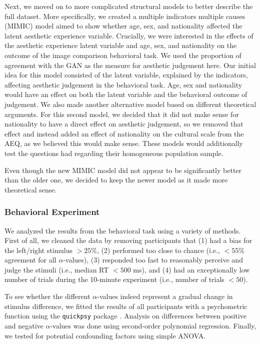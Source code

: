 \documentclass[../main.tex]{subfiles}
\begin{document}
	Next, we moved on to more complicated structural models to better describe the full dataset. More specifically, we created a multiple indicators multiple causes (MIMIC) model aimed to show whether age, sex, and nationality affected the latent aesthetic experience variable. Crucially, we were interested in the effects of the aesthetic experience latent variable and age, sex, and nationality on the outcome of the image comparison behavioral task. We used the proportion of agreement with the GAN as the measure for aesthetic judgement here. Our initial idea for this model consisted of the latent variable, explained by the indicators, affecting aesthetic judgement in the behavioral task. Age, sex and nationality would have an effect on both the latent variable and the behavioral outcome of judgement. We also made another alternative model based on different theoretical arguments. For this second model, we decided that it did not make sense for nationality to have a direct effect on aesthetic judgement, so we removed that effect and instead added an effect of nationality on the cultural scale from the AEQ, as we believed this would make sense. These models would additionally test the questions \textcite{wanzerExperiencingFlowViewing2020} had regarding their homogeneous population sample. 
	
	Even though the new MIMIC model did not appear to be significantly better than the older one, we decided to keep the newer model as it made more theoretical sense.
	
	
	
	\subsubsection{Behavioral Experiment}
	We analyzed the results from the behavioral task using a variety of methods. First of all, we cleaned the data by removing participants that (1) had a bias for the left/right stimulus $>25\%$, (2) performed too close to chance (i.e., $<55\%$ agreement for all $\alpha$-values), (3) responded too fast to reasonably perceive and judge the stimuli (i.e., median RT $<500$ ms), and (4) had an exceptionally low number of trials during the 10-minute experiment (i.e., number of trials $<50$).
	
	To see whether the different $\alpha$-values indeed represent a gradual change in stimulus difference, we fitted the results of all participants with a psychometric function using the \texttt{quickpsy} package \parencite{linares2016quickpsy}. Analysis on differences between positive and negative $\alpha$-values was done using second-order polynomial regression. Finally, we tested for potential confounding factors using simple ANOVA.
	
\end{document}
